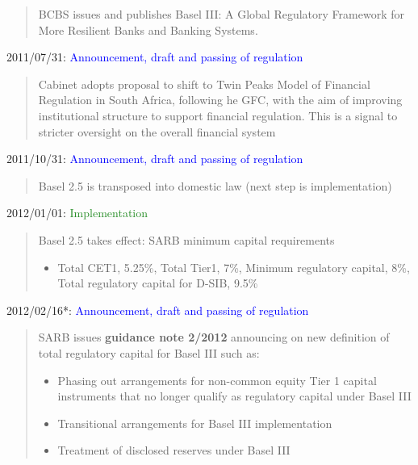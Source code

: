 \documentclass[
  letterpaper,
  DIV=11,
  numbers=noendperiod]{scrartcl}
\begin{document}
\begin{quote}BCBS issues and publishes Basel III: A Global Regulatory Framework for More Resilient Banks and Banking Systems.
\end{quote}

2011/07/31:
\textcolor{blue}{Announcement, draft and passing of regulation}

\begin{quote}
Cabinet adopts proposal to shift to Twin Peaks Model of Financial Regulation in South Africa, following he GFC, with the aim of improving  institutional structure to support financial regulation. This is a signal to stricter oversight on the overall financial system
\end{quote}

2011/10/31:
\textcolor{blue}{Announcement, draft and passing of regulation}

\begin{quote}
    Basel 2.5 is transposed into domestic law (next step is implementation)
\end{quote}

2012/01/01: \textcolor{ForestGreen}{Implementation}

\begin{quote}
    Basel 2.5 takes effect: SARB minimum capital requirements
    \begin{itemize}
        \item Total CET1, 5.25\%, Total Tier1, 7\%, Minimum regulatory capital, 8\%, Total regulatory capital for D-SIB, 9.5\%
    \end{itemize}
\end{quote}

2012/02/16*:
\textcolor{blue}{Announcement, draft and passing of regulation}

\begin{quote}

SARB issues \textbf{guidance note 2/2012} announcing on new definition of total regulatory capital for Basel III such as:
\begin{itemize}
    \item Phasing out arrangements for non-common equity Tier 1 capital instruments that no longer qualify as regulatory capital under Basel III
 \item Transitional arrangements for Basel III implementation
\item Treatment of disclosed reserves under Basel III

\end{itemize}
\end{quote}
\end{document}
